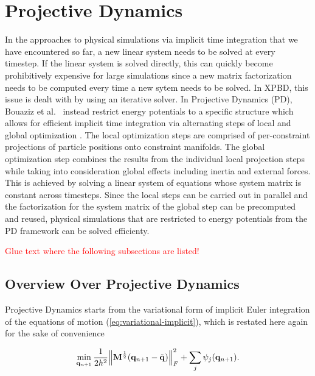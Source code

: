 \section{Projective Dynamics}\label{s:pd}

In the approaches to physical simulations via implicit time integration that we have encountered so far, a new linear system needs to be solved
at every timestep. If the linear system is solved directly, this can quickly become prohibitively expensive for large simulations since 
a new matrix factorization needs to be computed every time a new sytem needs to be solved. In XPBD, this issue is dealt with by using an iterative 
solver. In Projective Dynamics (PD), Bouaziz et al.\ \cite{bouaziz2014} instead restrict energy potentials to a specific structure 
which allows for efficient implicit time integration via alternating steps of local and global optimization \cite{bouaziz2014}. The local 
optimization steps are comprised of per-constraint projections of particle positions onto constraint manifolds. The global optimization 
step combines the results from the individual 
local projection steps while taking into consideration global effects including inertia and external forces. This is achieved by solving a 
linear system of equations whose system matrix is constant across timesteps. Since the local steps can be carried out in parallel and the 
factorization for the system matrix of the global step can be precomputed and reused, physical simulations that are restricted to energy 
potentials from the PD framework can be solved efficienty.

\textcolor{red}{Glue text where the following subsections are listed!}

\subsection{Overview Over Projective Dynamics}\label{ss:pd-overview}
Projective Dynamics starts from the variational form of implicit Euler integration of the equations of motion (\cref{eq:variational-implicit}),
which is restated here again for the sake of convenience

\begin{equation}\label{eq:pd-variational-implicit}
    \min_{\mathbf{q}_{n+1}} \frac{1}{2h^2} \norm{\mathbf{M}^{\frac{1}{2}}(\mathbf{q}_{n+1} - \tilde{\mathbf{q}})}^2_F + \sum_j \psi_j(\mathbf{q}_{n+1}).
\end{equation}

